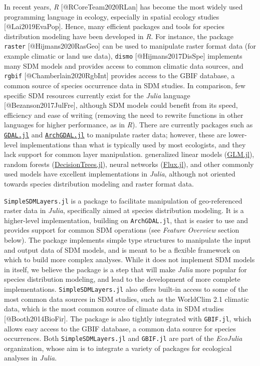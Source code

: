 \documentclass[
]{article}
\begin{document}
In recent years, \emph{R} {[}@RCoreTeam2020RLan{]} has become the most
widely used programming language in ecology, especially in spatial
ecology studies {[}@Lai2019EvaPop{]}. Hence, many efficient packages and
tools for species distribution modeling have been developed in \emph{R}.
For instance, the package \texttt{raster}
{[}@Hijmans2020RasGeo{]} can be used to manipulate raster format data
(for example climatic or land use data), \texttt{dismo}
{[}@Hijmans2017DisSpe{]} implements many SDM models and provides access
to common climatic data sources, and \texttt{rgbif}
{[}@Chamberlain2020RgbInt{]} provides access to the GBIF database, a
common source of species occurrence data in SDM studies. In comparison,
few specific SDM resources currently exist for the \emph{Julia} language
{[}@Bezanson2017JulFre{]}, although SDM models could benefit from its
speed, efficiency and ease of writing (removing the need to rewrite
functions in other languages for higher performance, as in \emph{R}).
There are currently packages such as
\href{https://github.com/JuliaGeo/GDAL.jl}{\texttt{GDAL.jl}}
and
\href{https://github.com/yeesian/ArchGDAL.jl}{\texttt{ArchGDAL.jl}}
to manipulate raster data; however, these are lower-level
implementations than what is typically used by most ecologists, and they
lack support for common layer manipulation. generalized linear models
(\href{https://github.com/JuliaStats/GLM.jl}{GLM.jl}), random forests
(\href{https://github.com/bensadeghi/DecisionTree.jl}{DecisionTrees.jl}),
neural networks (\href{https://github.com/FluxML/Flux.jl}{Flux.jl}), and
other commonly used models have excellent implementations in
\emph{Julia}, although not oriented towards species distribution
modeling and raster format data.

\texttt{SimpleSDMLayers.jl} is a package to facilitate
manipulation of geo-referenced raster data in \emph{Julia}, specifically
aimed at species distribution modeling. It is a higher-level
implementation, building on \texttt{ArchGDAL.jl}, that is
easier to use and provides support for common SDM operations (see
\emph{Feature Overview} section below). The package implements simple
type structures to manipulate the input and output data of SDM models,
and is meant to be a flexible framework on which to build more complex
analyses. While it does not implement SDM models in itself, we believe
the package is a step that will make \emph{Julia} more popular for
species distribution modeling, and lead to the development of more
complete implementations. \texttt{SimpleSDMLayers.jl} also
offers built-in access to some of the most common data sources in SDM
studies, such as the WorldClim 2.1 climatic data, which is the most
common source of climate data in SDM studies {[}@Booth2014BioFir{]}. The
package is also tightly integrated with \texttt{GBIF.jl},
which allows easy access to the GBIF database, a common data source for
species occurrences. Both \texttt{SimpleSDMLayers.jl} and
\texttt{GBIF.jl} are part of the \emph{EcoJulia}
organization, whose aim is to integrate a variety of packages for
ecological analyses in \emph{Julia}.
\end{document}
